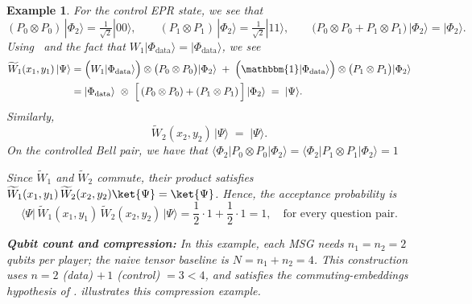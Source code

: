 \documentclass{article}
\newtheorem{example}{Example}
\begin{document}
\begin{example}
    For the control EPR state, we see that 
    \begin{equation}
         (P_0\otimes P_0)\,|\Phi_{2}\rangle = \tfrac{1}{\sqrt{2}}|00\rangle,\qquad
        (P_1\otimes P_1)\,|\Phi_{2}\rangle = \tfrac{1}{\sqrt{2}}|11\rangle,\qquad
        \big(P_0\otimes P_0 + P_1\otimes P_1\big)\,|\Phi_{2}\rangle = |\Phi_{2}\rangle.
    \end{equation}
    Using~ and the fact that $W_1|\Phi_{\mathrm{data}}\rangle=|\Phi_{\mathrm{data}}\rangle$,
    we see 
    \begin{align*}
        \widetilde W_1(x_1,y_1)\,|\Psi\rangle
        &= \Big(W_1|\Phi_{\mathrm{data}}\rangle\Big)\otimes\big(P_0\otimes P_0\big)|\Phi_2\rangle
        \;+\;\Big(\mathbbm{1}|\Phi_{\mathrm{data}}\rangle\Big)\otimes\big(P_1\otimes P_1\big)|\Phi_2\rangle\\
        &= |\Phi_{\mathrm{data}}\rangle\ \otimes\ \Big[\,(P_0\otimes P_0)+(P_1\otimes P_1)\,\Big]\,|\Phi_2\rangle
        \;=\;|\Psi\rangle.
    \end{align*}
    Similarly, 
    \begin{equation}
         \widetilde W_2(x_2,y_2)\,|\Psi\rangle \;=\; |\Psi\rangle.
    \end{equation}
    On the controlled Bell pair, we have that $\langle\Phi_2|P_0\otimes P_0|\Phi_2\rangle=\langle\Phi_2|P_1\otimes P_1|\Phi_2\rangle=1$
    
    Since $\widetilde{W}_1$ and $\widetilde{W}_2$ commute, their product satisfies $\widetilde W_1(x_1,y_1)\,\widetilde W_2(x_2,y_2)\ket{\Psi}=\ket{\Psi}$. Hence, the acceptance probability is 
    \begin{equation}
      \big\langle \Psi\big|\, \widetilde W_1(x_1,y_1)\,\widetilde W_2(x_2,y_2)\,\big|\Psi\big\rangle = \frac{1}{2}\cdot 1+ \frac{1}{2}\cdot 1=1, 
      \quad\text{for every question pair}.
    \end{equation}

    \textbf{Qubit count and compression:} In this example, each MSG needs $n_1=n_2=2$ qubits per player; the naive tensor baseline is $N=n_1+n_2=4$. This construction uses $n=2$ (data) $+\,1$ (control) $=3<4$, and satisfies the commuting-embeddings hypothesis of .  illustrates this compression example. 
\end{example}
\end{document}
